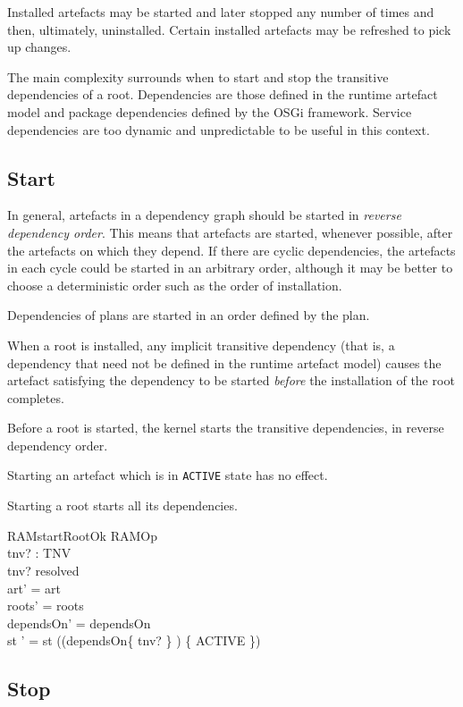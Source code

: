 \documentclass[a4paper,12pt]{article}
\begin{document}
Installed artefacts may be started and later stopped any number of times and then, ultimately, uninstalled.
Certain installed artefacts may be refreshed to pick up changes.

The main complexity surrounds when to start and stop the transitive dependencies of a root.
Dependencies are those defined in the runtime artefact model and package dependencies
defined by the OSGi framework.
Service dependencies are too dynamic and unpredictable to be useful in this context.

\subsection*{Start}

In general, artefacts in a dependency graph should be started in \textit{reverse dependency order}.
This means that artefacts are started, whenever possible, after the artefacts on which they depend.
If there are cyclic dependencies, the artefacts in each cycle could be started in an arbitrary order,
although it may be better to choose a deterministic order such as the order of installation.

Dependencies of plans are started in an order defined by the plan.

When a root is installed, any implicit transitive dependency (that is, a dependency that need not
be defined in the runtime
artefact model) causes the artefact satisfying the dependency to be started \textit{before} the installation of the root completes.

Before a root is started, the kernel starts the transitive dependencies, in reverse dependency order.

Starting an artefact which is in \texttt{ACTIVE} state has no effect.

Starting a root starts all its dependencies.
\begin{schema}{RAMstartRootOk}
RAMOp \\
tnv? : TNV \\
\where
tnv? \in resolved \\
art' = art \\
roots' = roots \\
dependsOn' = dependsOn \\
st ' = st \oplus ((dependsOn\star \limg \{ tnv? \} \rimg) \cross \{ ACTIVE \}) \\
\end{schema}

\subsection*{Stop}
\end{document}
